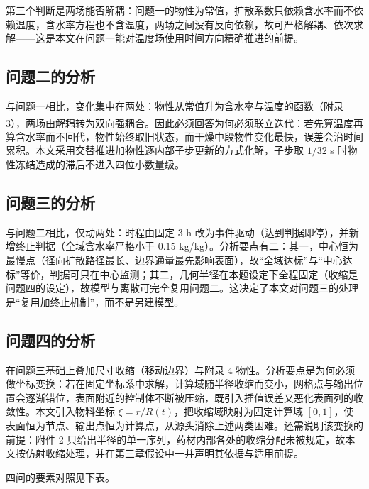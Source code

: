 第三个判断是两场能否解耦：问题一的物性为常值，扩散系数只依赖含水率而不依赖温度，含水率方程也不含温度，两场之间没有反向依赖，故可严格解耦、依次求解——这是本文在问题一能对温度场使用时间方向精确推进的前提。

\subsection{问题二的分析}
与问题一相比，变化集中在两处：物性从常值升为含水率与温度的函数（附录 3），两场由解耦转为双向强耦合\textsuperscript{\cite{ref2,ref9}}。因此必须回答为何必须联立迭代：若先算温度再算含水率而不回代，物性始终取旧状态，而干燥中段物性变化最快，误差会沿时间累积。本文采用交替推进加物性逐内部子步更新的方式化解，子步取 $1/32$ s 时物性冻结造成的滞后不进入四位小数量级。

\subsection{问题三的分析}
与问题二相比，仅动两处：时程由固定 3 h 改为事件驱动（达到判据即停），并新增终止判据（全域含水率严格小于 $0.15$ kg/kg）。分析要点有二：其一，中心恒为最慢点（径向扩散路径最长、边界通量最先影响表面），故“全域达标”与“中心达标”等价，判据可只在中心监测；其二，几何半径在本题设定下全程固定（收缩是问题四的设定），故模型与离散可完全复用问题二。这决定了本文对问题三的处理是“复用加终止机制”，而不是另建模型。

\subsection{问题四的分析}
在问题三基础上叠加尺寸收缩（移动边界）与附录 4 物性。分析要点是为何必须做坐标变换：若在固定坐标系中求解，计算域随半径收缩而变小，网格点与输出位置会逐渐错位，表面附近的控制体不断被压缩，既引入插值误差又恶化表面列的收敛性。本文引入物料坐标 $\xi=r/R(t)$，把收缩域映射为固定计算域 $[0,1]$，使表面恒为节点、输出点恒为计算点，从源头消除上述两类困难。还需说明该变换的前提：附件 2 只给出半径的单一序列，药材内部各处的收缩分配未被规定，故本文按仿射收缩处理，并在第三章假设中一并声明其依据与适用前提。

四问的要素对照见下表。



